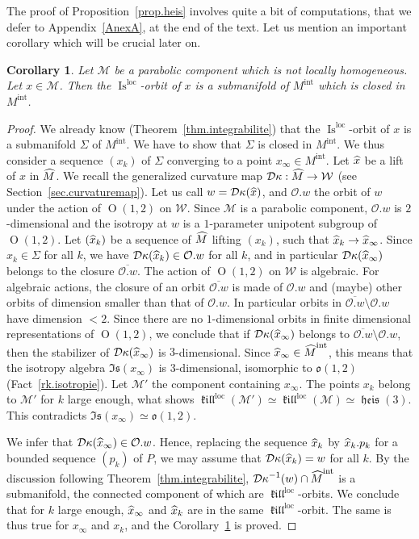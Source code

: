 \documentclass[11pt]{article}
\newtheorem{coro}[theo]{Corollary}
\theoremstyle{definition}
\numberwithin{equation}{section}
\numberwithin{figure}{section}
\numberwithin{table}{section}
\DeclareMathOperator{\Omp}{O}%
\DeclareMathOperator{\Is}{Is}
\DeclareMathOperator{\loc}{loc}
\newcommand{\mint}{{M^{\intl}}}
\newcommand{\hmint}{{{\hat M}^{\intl}}}
\DeclareMathOperator{\intl}{int}
\DeclareMathOperator{\kil}{{\mathfrak{kill}}}
\newcommand{\kiloc}{\kil^{\loc}}
\DeclareMathOperator{\heis}{{\mathfrak{heis}}}
\newcommand{\calm}{\mathcal{M}}
\newcommand{\calo}{\mathcal{O}}
\newcommand*\dk{{\mathcal{D}\kappa}}
\newcommand{\oo}{{\mathfrak{o}}}
\newcommand{\hm}{{\hat{M}}}
\newcommand{\hx}{{\hat{x}}}
\let\oldhat\hat
\renewcommand*\hat[1]{\mathchoice{\widehat{#1}}{\widehat{#1}}{\widehat{#1}}{\oldhat{#1}}}
\let\oldbar\bar
\renewcommand*{\bar}[1]{\mathchoice{\widebar{#1}}{\widebar{#1}}{\oldbar{#1}}{\oldbar{#1}}}
\let\oldoverline\overline
\renewcommand*{\overline}{\bar}
\begin{document}
The proof of Proposition~\ref{prop.heis} involves quite a bit of computations, that we defer to Appendix~\ref{AnexA}, at the end of the text. Let us mention an important corollary which will be crucial later on.

\begin{coro}\label{coro.islocorbites}
Let $\calm$ be a parabolic component which is not locally homogeneous. Let $x \in \calm$. Then the $\Is^{\loc}$-orbit of $x$ is a submanifold of $\mint$ which is closed in $\mint$.
\end{coro}

\begin{proof}
We already know (Theorem~\ref{thm.integrabilite}) that the $\Is^{\loc}$-orbit of $x$ is a submanifold $\Sigma$ of $\mint$. We have to show that $\Sigma$ is closed in $\mint$. We thus consider a sequence $(x_k)$ of $\Sigma$ converging to a point $x_{\infty} \in \mint$. Let $\hx$ be a lift of $x$ in $\hm$. We recall the generalized curvature map $\dk: \hm \to \mathcal{W}$ (see Section~\ref{sec.curvaturemap}). Let us call $w=\dk(\hx)$, and $\mathcal{O}.w$ the orbit of $w$ under the action of $\Omp(1,2)$ on $\mathcal{W}$. Since $\calm$ is a parabolic component, $\mathcal{O}.w$ is $2$-dimensional and the isotropy at $w$ is a $1$-parameter unipotent subgroup of $\Omp(1,2)$. Let $(\hx_k)$ be a sequence of $\hm$ lifting $(x_k)$, such that $\hx_k \to \hx_{\infty}$. Since $x_k \in \Sigma$ for all $k$, we have $\dk(\hx_k) \in \mathcal{O}.w$ for all $k$, and in particular $\dk(\hx_{\infty})$ belongs to the closure $\oldoverline{\mathcal{O}.w}$. The action of $\Omp(1,2)$ on $\mathcal{W}$ is algebraic. For algebraic actions, the closure of an orbit $\oldoverline{\mathcal{O}.w}$ is made of $\calo.w$ and (maybe) other orbits of dimension smaller than that of $\calo.w$. In particular orbits in $\oldoverline{\mathcal{O}.w} \setminus \calo.w$ have dimension $<2$. Since there are no $1$-dimensional orbits in finite dimensional representations of $\Omp(1,2)$, we conclude that if $\dk(\hx_{\infty})$ belongs to $\oldoverline{\mathcal{O}.w} \setminus \calo.w$, then the stabilizer of $\dk(\hx_{\infty})$ is $3$-dimensional. Since $\hx_{\infty} \in \hmint$, this means that the isotropy algebra $\mathfrak{Is}(x_{\infty})$ is $3$-dimensional, isomorphic to $\oo(1,2)$ (Fact~\ref{rk.isotropie}). Let $\calm'$ the component containing $x_{\infty}$. The points $x_k$ belong to $\calm'$ for $k$ large enough, what shows $\kiloc(\calm') \simeq \kiloc(\calm)\simeq \heis(3)$. This contradicts $\mathfrak{Is}(x_{\infty}) \simeq \oo(1,2)$.

We infer that $\dk(\hx_{\infty}) \in \calo.w$. Hence, replacing the sequence $\hx_k$ by $\hx_k.p_k$ for a bounded sequence $(p_k)$ of $P$, we may assume that $\dk(\hx_k)=w$ for all $k$. By the discussion following Theorem~\ref{thm.integrabilite}, $\dk^{-1}(w) \cap \hmint$ is a submanifold, the connected component of which are $\kiloc$-orbits. We conclude that for $k$ large enough, $\hx_{\infty}$ and $\hx_k$ are in the same $\kiloc$-orbit. The same is thus true for $x_{\infty}$ and $x_k$, and the Corollary~\ref{coro.islocorbites} is proved.
\end{proof}
\end{document}
